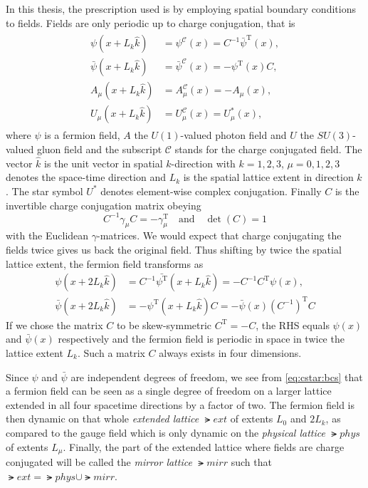 In this thesis, the prescription used is  by employing spatial \Cstar boundary conditions to fields.
Fields are only periodic up to charge conjugation, that is
\begin{align} \label{eq:cstar:bcs}
  \begin{split}
    \psi(x + L_k \hat{k})       &= \psi^{\mathcal{C}}(x)       = C^{-1}\bar{\psi}^{\text{T}}(x), \\
    \bar{\psi}(x + L_k \hat{k}) &= \bar{\psi}^{\mathcal{C}}(x) = -\psi^{\text{T}}(x)C, \\
    A_{\mu}(x + L_k \hat{k})    &= A_{\mu}^{\mathcal{C}}(x)    = - A_{\mu}(x), \\
    U_{\mu}(x + L_k \hat{k})    &= U_{\mu}^{\mathcal{C}}(x)    = U_{\mu}^{*}(x),
  \end{split}
\end{align}
where $\psi$ is a fermion field, $A$ the $U(1)$-valued photon field and $U$ the $SU(3)$-valued gluon field and the subscript $\mathcal{C}$ stands for the charge conjugated field. The vector $\hat{k}$ is the unit vector in spatial $k$-direction with $k=1,2,3$, $\mu=0,1,2,3$ denotes the space-time direction and $L_k$ is the spatial lattice extent in direction $k$. The star symbol $U^{*}$ denotes element-wise complex conjugation. Finally $C$ is the invertible charge conjugation matrix obeying
\begin{equation}
  C^{-1} \gamma_{\mu} C = - \gamma_{\mu}^{\text{T}}
  \quad
  \text{and}
  \quad
  \det(C) = 1
\end{equation}
with the Euclidean $\gamma$-matrices. We would expect that charge conjugating the fields twice gives us back the original field. Thus shifting by twice the spatial lattice extent, the fermion field transforms as
\begin{align}
  \psi(x + 2 L_k \hat{k}) &= C^{-1}\bar{\psi^{\text{T}}}(x + L_k \hat{k}) = - C^{-1} C^{\text{T}} \psi(x), \\
  \bar{\psi}(x + 2 L_k \hat{k}) &= -\psi^{\text{T}}(x + L_k \hat{k})C = - \bar{\psi}(x) (C^{-1})^{\text{T}} C
\end{align}
If we chose the matrix $C$ to be skew-symmetric $C^{\text{T}} = -C$, the RHS equals $\psi(x)$ and $\bar{\psi}(x)$ respectively and the fermion field is periodic in space in twice the lattice extent $L_k$. Such a matrix $C$ always exists in four dimensions.

Since $\psi$ and $\bar{\psi}$ are independent degrees of freedom, we see from \cref{eq:cstar:bcs} that a fermion field can be seen as a single degree of freedom on a larger lattice extended in all four spacetime directions by a factor of two.
The fermion field is then dynamic on that whole \emph{extended lattice} $\lat{ext}$ of extents $L_0$ and $2 L_{k}$, as compared to the gauge field which is only dynamic on the \emph{physical lattice} $\lat{phys}$ of extents $L_{\mu}$.
Finally, the part of the extended lattice where fields are charge conjugated will be called the \emph{mirror lattice} $\lat{mirr}$ such that $\lat{ext} = \lat{phys} \cup \lat{mirr}$.

